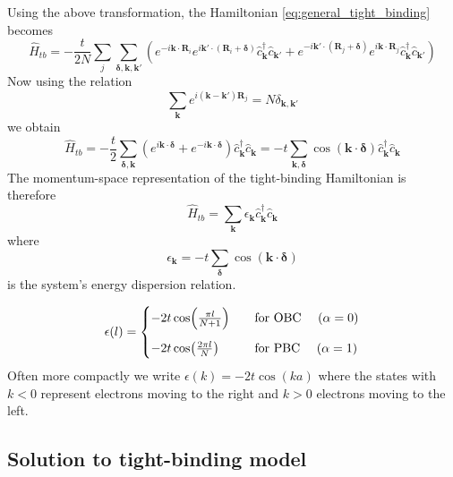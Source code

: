 \documentclass[11pt, a4paper]{article}
\theoremstyle{definition} %
\begin{document}
 

Using the above transformation, the Hamiltonian \ref{eq:general_tight_binding} becomes
\begin{equation}
	\hat{H}_{tb} = - \frac{t}{2N} \sum_j \sum_{\mathbf{\delta}, \mathbf{k}, \mathbf{k}'} (e^{-i \mathbf{k} \cdot \mathbf{R}_i} e^{i \mathbf{k}' \cdot (\mathbf{R}_i + \mathbf{\delta})} \hat{c}^\dagger_{\mathbf{k}} \hat{c}_{\mathbf{k}'} + e^{-i \mathbf{k}' \cdot (\mathbf{R}_j + \mathbf{\delta})} e^{i \mathbf{k} \cdot \mathbf{R}_j} \hat{c}_{\mathbf{k}}^\dagger \hat{c}_{\mathbf{k}'} )
\end{equation}
Now using the relation
\begin{equation}
	\sum_{\mathbf{k}} e^{i(\mathbf{k} - \mathbf{k}')\mathbf{R}_j} = N \delta_{\mathbf{k},\mathbf{k}'}
\end{equation}
we obtain
\begin{equation}
	\hat{H}_{tb} = -\frac{t}{2} \sum_{\mathbf{\delta}, \mathbf{k}} (e^{i\mathbf{k} \cdot \mathbf{\delta}} + e^{-i\mathbf{k} \cdot \mathbf{\delta}})\hat{c}_{\mathbf{k}}^\dagger \hat{c}_{\mathbf{k}} = -t \sum_{\mathbf{k}, \mathbf{\delta}} \cos(\mathbf{k}\cdot \mathbf{\delta}) \hat{c}_{\mathbf{k}}^\dagger \hat{c}_{\mathbf{k}}
\end{equation}
The momentum-space representation of the tight-binding Hamiltonian is therefore
\begin{equation}
	\hat{H}_{tb} = \sum_{\mathbf{k}} \epsilon_{\mathbf{k}} \hat{c}_{\mathbf{k}}^\dagger \hat{c}_{\mathbf{k}}
\end{equation}
where
\begin{equation}
	\epsilon_{\mathbf{k}} = -t \sum_{\mathbf{\delta}} \cos(\mathbf{k} \cdot \mathbf{\delta})
\end{equation}
is the system's energy dispersion relation.


\begin{equation}
	\epsilon(l) = \begin{cases}
		- 2t\cos(\frac{\pi l}{N+1}) &\qq{for OBC } (\alpha = 0) \\[10pt]
		- 2t\cos(\frac{2\pi l}{N}) &\qq{for PBC } (\alpha = 1)
	\end{cases}
\end{equation}
Often more compactly we write $\epsilon(k) = -2t\cos(ka)$ where the states with $k < 0$ represent electrons moving to the right and $k>0$ electrons moving to the left.



\subsection{Solution to tight-binding model}
\end{document}
